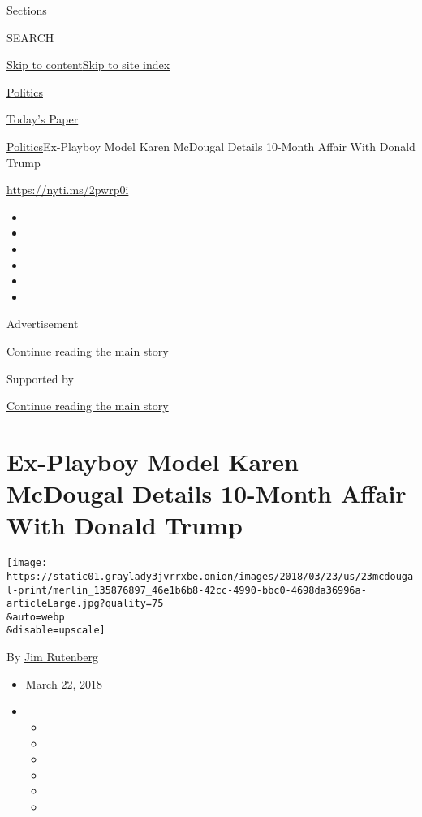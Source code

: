 Sections

SEARCH

\protect\hyperlink{site-content}{Skip to
content}\protect\hyperlink{site-index}{Skip to site index}

\href{https://www.nytimes3xbfgragh.onion/section/politics}{Politics}

\href{https://myaccount.nytimes3xbfgragh.onion/auth/login?response_type=cookie\&client_id=vi}{}

\href{https://www.nytimes3xbfgragh.onion/section/todayspaper}{Today's
Paper}

\href{/section/politics}{Politics}\textbar{}Ex-Playboy Model Karen
McDougal Details 10-Month Affair With Donald Trump

\url{https://nyti.ms/2pwrp0i}

\begin{itemize}
\item
\item
\item
\item
\item
\item
\end{itemize}

Advertisement

\protect\hyperlink{after-top}{Continue reading the main story}

Supported by

\protect\hyperlink{after-sponsor}{Continue reading the main story}

\hypertarget{ex-playboy-model-karen-mcdougal-details-10-month-affair-with-donald-trump}{%
\section{Ex-Playboy Model Karen McDougal Details 10-Month Affair With
Donald
Trump}\label{ex-playboy-model-karen-mcdougal-details-10-month-affair-with-donald-trump}}

\texttt{[image: https://static01.graylady3jvrrxbe.onion/images/2018/03/23/us/23mcdougal-print/merlin\_135876897\_46e1b6b8-42cc-4990-bbc0-4698da36996a-articleLarge.jpg?quality=75\\\&auto=webp\\\&disable=upscale]}

By \href{https://www.nytimes3xbfgragh.onion/by/jim-rutenberg}{Jim
Rutenberg}

\begin{itemize}
\item
  March 22, 2018
\item
  \begin{itemize}
  \item
  \item
  \item
  \item
  \item
  \item
  \end{itemize}
\end{itemize}

